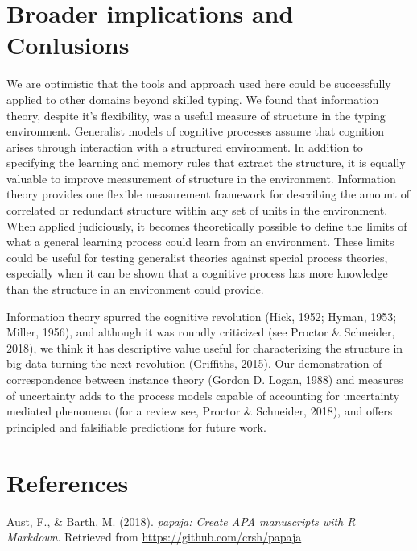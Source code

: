 \documentclass[floatsintext,man]{apa6}
\theoremstyle{definition}
\theoremstyle{definition}
\theoremstyle{definition}
\theoremstyle{remark}
\begin{document}
\section{Broader implications and
Conlusions}\label{broader-implications-and-conlusions}

We are optimistic that the tools and approach used here could be
successfully applied to other domains beyond skilled typing. We found
that information theory, despite it's flexibility, was a useful measure
of structure in the typing environment. Generalist models of cognitive
processes assume that cognition arises through interaction with a
structured environment. In addition to specifying the learning and
memory rules that extract the structure, it is equally valuable to
improve measurement of structure in the environment. Information theory
provides one flexible measurement framework for describing the amount of
correlated or redundant structure within any set of units in the
environment. When applied judiciously, it becomes theoretically possible
to define the limits of what a general learning process could learn from
an environment. These limits could be useful for testing generalist
theories against special process theories, especially when it can be
shown that a cognitive process has more knowledge than the structure in
an environment could provide.

Information theory spurred the cognitive revolution (Hick, 1952; Hyman,
1953; Miller, 1956), and although it was roundly criticized (see Proctor
\& Schneider, 2018), we think it has descriptive value useful for
characterizing the structure in big data turning the next revolution
(Griffiths, 2015). Our demonstration of correspondence between instance
theory (Gordon D. Logan, 1988) and measures of uncertainty adds to the
process models capable of accounting for uncertainty mediated phenomena
(for a review see, Proctor \& Schneider, 2018), and offers principled
and falsifiable predictions for future work.

\newpage

\section{References}\label{references}

\begingroup
\setlength{\parindent}{-0.5in} \setlength{\leftskip}{0.5in}

\hypertarget{refs}{}
\hypertarget{ref-R-papaja}{}
Aust, F., \& Barth, M. (2018). \emph{papaja: Create APA manuscripts with
R Markdown}. Retrieved from \url{https://github.com/crsh/papaja}
\end{document}
